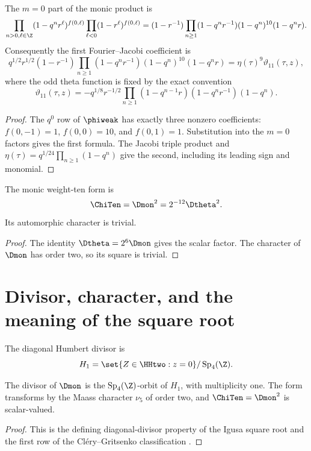 \begin{proposition}
The $m=0$ part of the monic product is
\[
 \prod_{n>0,\ell\in\Z}(1-q^nr^\ell)^{f(0,\ell)}
 \prod_{\ell<0}(1-r^\ell)^{f(0,\ell)}
 =(1-r^{-1})\prod_{n\ge1}
 (1-q^nr^{-1})(1-q^n)^{10}(1-q^nr).
\]
Consequently the first Fourier--Jacobi coefficient is
\[
 q^{1/2}r^{1/2}(1-r^{-1})
 \prod_{n\ge1}(1-q^nr^{-1})(1-q^n)^{10}(1-q^nr)
 =\eta(\tau)^9\vartheta_{11}(\tau,z),
\]
where the odd theta function is fixed by the exact convention
\[
 \vartheta_{11}(\tau,z)
 =-q^{1/8}r^{-1/2}
 \prod_{n\ge1}(1-q^{n-1}r)(1-q^nr^{-1})(1-q^n).
\]
\end{proposition}
\begin{proof}
The $q^0$ row of $\phiweak$ has exactly three nonzero coefficients:
$f(0,-1)=1$, $f(0,0)=10$, and $f(0,1)=1$. Substitution into the $m=0$ factors gives the first formula. The Jacobi triple product and $\eta(\tau)=q^{1/24}\prod_{n\ge1}(1-q^n)$ give the second, including its leading sign and monomial.
\end{proof}

\begin{corollary}
The monic weight-ten form is
\[
 \ChiTen=\Dmon^2=2^{-12}\Dtheta^2.
\]
Its automorphic character is trivial.
\end{corollary}
\begin{proof}
The identity $\Dtheta=2^6\Dmon$ gives the scalar factor.  The character of $\Dmon$ has order two, so its square is trivial.
\end{proof}

\chapter{Divisor, character, and the meaning of the square root}
The diagonal Humbert divisor is
\[
 H_1=\set{Z\in\HHtwo:z=0}/\operatorname{Sp}_4(\Z).
\]

\begin{theorem}
The divisor of $\Dmon$ is the $\operatorname{Sp}_4(\Z)$-orbit of $H_1$, with multiplicity one. The form transforms by the Maass character $\nu_5$ of order two, and $\ChiTen=\Dmon^2$ is scalar-valued.
\end{theorem}
\begin{proof}
This is the defining diagonal-divisor property of the Igusa square root and the first row of the Cl\'ery--Gritsenko classification \cite{Igusa62,Igusa64,GC}.
\end{proof}


